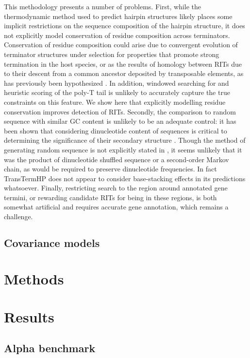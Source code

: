 This methodology presents a number of problems. First, while the thermodynamic method used to predict hairpin structures likely places some implicit restrictions on the sequence composition of the hairpin structure, it does not explicitly model conservation of residue composition across terminators. Conservation of residue composition could arise due to convergent evolution of terminator structures under selection for properties that promote strong termination in the host species, or as the results of homology between RITs due to their descent from a common ancestor deposited by transposable elements, as has previously been hypothesized \parencite{Naville2011}. In addition, windowed searching for and heuristic scoring of the poly-T tail is unlikely to accurately capture the true constraints on this feature. We show here that explicitly modelling residue conservation improves detection of RITs. Secondly, the comparison to random sequence with similar GC content is unlikely to be an adequate control: it has been shown that considering dinucleotide content of sequences is critical to determining the significance of their secondary structure \parencite{Workman1999}. Though the method of generating random sequence is not explicitly stated in \textcite{Kingsford2007}, it seems unlikely that it was the product of dinucleotide shuffled sequence or a second-order Markov chain, as would be required to preserve dinucleotide frequencies. In fact TransTermHP does not appear to consider base-stacking effects in its predictions whatsoever. Finally, restricting search to the region around annotated gene termini, or rewarding candidate RITs for being in these regions, is both somewhat artificial and requires accurate gene annotation, which remains a challenge.

\subsection{Covariance models}

\section{Methods}

\section{Results}
\subsection{Alpha benchmark}

